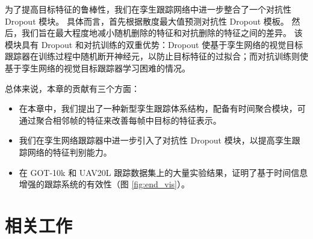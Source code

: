 为了提高目标特征的鲁棒性，我们在孪生跟踪网络中进一步整合了一个对抗性 Dropout \cite{park2018adversarial} 模块。
具体而言，首先根据散度最大值预测对抗性 Dropout 模板。
然后，我们旨在最大程度地减小随机删除的特征和对抗删除的特征之间的差异。
该模块具有 Dropout 和对抗训练的双重优势：Dropout 使基于孪生网络的视觉目标跟踪器在训练过程中随机断开神经元，以防止目标特征的过拟合；而对抗训练则使基于孪生网络的视觉目标跟踪器学习困难的情况。

总体来说，本章的贡献有三个方面：
\begin{itemize}
\item 在本章中，我们提出了一种新型孪生跟踪体系结构，配备有时间聚合模块，可通过聚合相邻帧的特征来改善每帧中目标的特征表示。
\item 我们在孪生网络跟踪器中进一步引入了对抗性 Dropout 模块，以提高孪生跟踪网络的特征判别能力。
\item 在 GOT-10k \cite{GOT-10k} 和 UAV20L \cite{mueller2016benchmark} 跟踪数据集上的大量实验结果，证明了基于时间信息增强的跟踪系统的有效性（图 \ref{fig:end_vis}）。
\end{itemize}

\section{相关工作}
